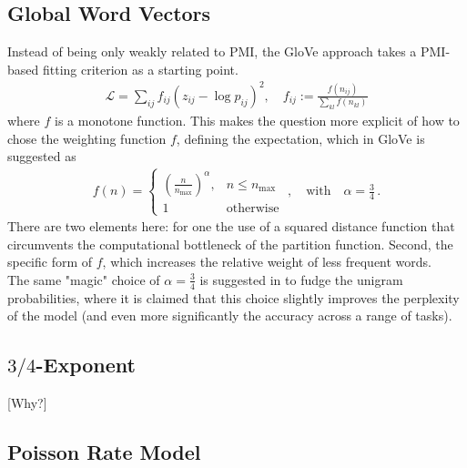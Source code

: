 \documentclass{article}
\newcommand{\logl}{{\mathcal L}}
\begin{document}
\subsection{Global Word Vectors}

Instead of being only weakly related to PMI, the GloVe approach \cite{pennington2014glove} takes a PMI-based fitting criterion as a starting point. 
\begin{align}
\logl = \sum_{ij} f_{ij} ( z_{ij} - \log p_{ij})^2, \quad f_{ij} := \frac{f(n_{ij})}{\sum_{kl} f(n_{kl})}
\end{align}
where $f$ is a monotone function. This makes the question more explicit of how to chose the weighting function $f$, defining the expectation, which in GloVe is suggested as 
\begin{align}
f(n) = \begin{cases}
\left( \frac{n}{n_{\max}}\right)^\alpha, & n \leq n_{\max} \\ 1 & \text{otherwise}
\end{cases} \;, \quad \text{with} \quad \alpha=\frac 34\,.
\end{align}
There are two elements here: for one the use of a squared distance function that circumvents the computational bottleneck of the partition function. Second, the specific form of $f$, which increases the relative weight of less frequent words. \\

The same "magic" choice of $\alpha = \frac 34$ is suggested in \cite[Section 2.2]{mikolov2013distributed} to fudge the unigram probabilities, where it is claimed that this choice slightly improves the perplexity of the model (and even more significantly the accuracy across a range of tasks). 

\subsection{$3/4$-Exponent}

[Why?]

\subsection{Poisson Rate Model}
\end{document}
